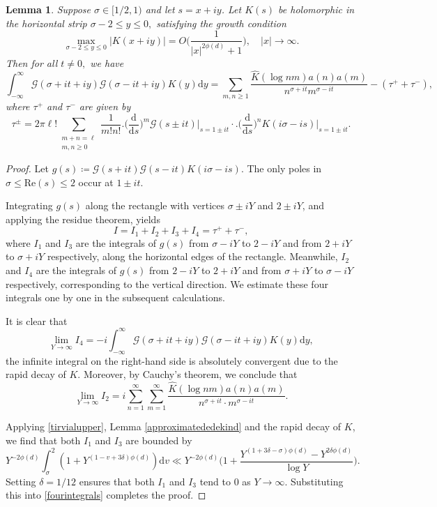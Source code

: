 \documentclass[12pt,reqno]{amsart}
\newtheorem{lem}[thm]{Lemma}
\theoremstyle{definition}
\numberwithin{equation}{section}
\newcommand{\mcg}{\mathcal{G}}
\begin{document}
\begin{lem}
    	\label{convolutionformula}
      Suppose $\sigma \in [1/2, 1)$ and let $s = x + iy$. Let $K(s)$ be holomorphic in the horizontal strip $\sigma-2 \le y \le 0,$ satisfying the growth condition
     $$
     \max_{\sigma-2\le y \le 0}|K(x+iy)|=O\Big(\frac{1}{|x|^{2 \phi(d)} + 1}\Big), \quad |x| \to \infty.
     $$
     Then for all $t \neq 0,$ we have
     $$
     \int_{-\infty}^{\infty} \mcg(\sigma + it + iy)\mcg(\sigma - it + iy)K(y)\mathrm{d}y = \sum_{m,n\ge1} \frac{\widehat{K}(\log nm) a(n)a(m)}{n^{\sigma + it} m^{\sigma - it}}  - (\tau^{+} + \tau^{-}),
     $$
     where $\tau^{+}$ and $\tau^{-}$ are given by
     $$
     \tau^\pm = 2\pi \ell!\sum_{\substack{m + n = \ell \\ m,n\ge 0}} \frac{1}{m!n!} \Big. \Big( \frac{\mathrm{d}}{\mathrm{d}s} \Big)^m \mcg(s \pm it) \Big|_{s = 1 \pm it} \cdot \Big. \Big( \frac{\mathrm{d}}{\mathrm{d}s} \Big)^n K(i\sigma - is) \Big|_{s = 1 \pm it}.
     $$
\end{lem}
\begin{proof}
    Let $g(s) \coloneqq  \mcg(s + it )\mcg(s - it)K(i\sigma - is)$. The only poles in $\sigma \le {\textrm{Re}}(s) \le 2$ occur at $1 \pm it$.
    \par
    Integrating $g(s)$ along the rectangle with vertices $\sigma \pm iY$ and $2 \pm iY$, and applying the residue theorem, yields
    \begin{equation}
        \label{fourintegrals}
            I = I_1 + I_2 + I_3 + I_4 = \tau^{+} + \tau^{-},
    \end{equation}
    where $I_1$ and $I_3$ are the integrals of $g(s)$ from $\sigma - iY$ to $2 - iY$ and from $2 + iY$ to $\sigma + iY$ respectively, along the horizontal edges of the rectangle. Meanwhile, $I_2$ and $I_4$ are the integrals of $g(s)$ from $2 - iY$ to $2 + iY$ and from $\sigma + iY$ to $\sigma - iY$ respectively, corresponding to the vertical direction. We estimate these four integrals one by one in the subsequent calculations.
    \par
    It is clear that 
    $$
    \lim_{Y \to \infty} I_4 = -i \int_{-\infty}^{\infty} \mcg(\sigma + it + iy)\mcg(\sigma - it + iy)K(y)\mathrm{d}y,
    $$
    the infinite integral on the right-hand side is absolutely convergent due to the rapid decay of $K$. Moreover, by Cauchy's theorem, we conclude that
    $$
    \lim_{Y \to \infty} I_2 = i \sum_{n = 1}^{\infty} \sum_{m = 1}^{\infty}  \frac{\widehat{K}(\log nm)a(n)a(m)}{n^{\sigma + it} \cdot m^{\sigma - it}}.
    $$
    \par
    Applying \eqref{tirvialupper}, Lemma \ref{approximatededekind} and the rapid decay of $K$, we find that both $I_1$ and $I_3$ are bounded by
    $$
   Y^{-2 \phi(d)}\int_{\sigma}^{2} (1 + Y^{(1 - v + 3\delta)\phi(d)}) \mathrm{d}v \ll Y^{-2 \phi(d)} \Big( 1 + \frac{Y^{(1 + 3\delta - \sigma)\phi(d)} - Y^{2\delta\phi(d)}}{\log Y} \Big).
    $$
    Setting $\delta = 1/12$ ensures that both $I_1$ and $I_3$ tend to $0$ as $Y \to \infty$. Substituting this into \eqref{fourintegrals} completes the proof. 
\end{proof}
\end{document}
